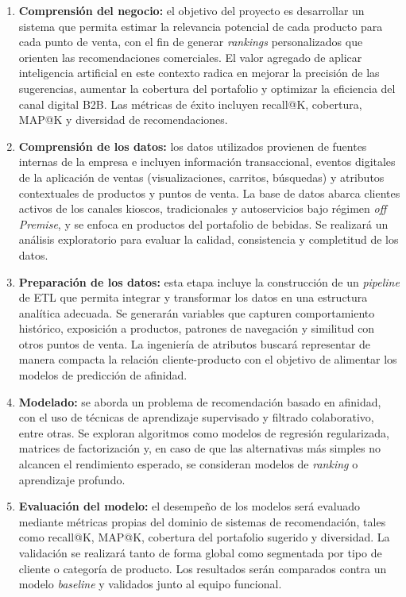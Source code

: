 \documentclass[
11pt, %
]{charter}
\begin{document}
\begin{enumerate}
\item \textbf{Comprensión del negocio:}
el objetivo del proyecto es desarrollar un sistema que permita estimar la relevancia potencial de cada producto para cada punto de venta, con el fin de generar \textit{rankings} personalizados que orienten las recomendaciones comerciales. El valor agregado de aplicar inteligencia artificial en este contexto radica en mejorar la precisión de las sugerencias, aumentar la cobertura del portafolio y optimizar la eficiencia del canal digital B2B. Las métricas de éxito incluyen recall@K, cobertura, MAP@K y diversidad de recomendaciones.

\item \textbf{Comprensión de los datos:}
los datos utilizados provienen de fuentes internas de la empresa e incluyen información transaccional, eventos digitales de la aplicación de ventas (visualizaciones, carritos, búsquedas) y atributos contextuales de productos y puntos de venta. La base de datos abarca clientes activos de los canales kioscos, tradicionales y autoservicios bajo régimen \textit{off Premise}, y se enfoca en productos del portafolio de bebidas. Se realizará un análisis exploratorio para evaluar la calidad, consistencia y completitud de los datos.

\item \textbf{Preparación de los datos:}
esta etapa incluye la construcción de un \textit{pipeline} de ETL que permita integrar y transformar los datos en una estructura analítica adecuada. Se generarán variables que capturen comportamiento histórico, exposición a productos, patrones de navegación y similitud con otros puntos de venta. La ingeniería de atributos buscará representar de manera compacta la relación cliente-producto con el objetivo de alimentar los modelos de predicción de afinidad.

\item \textbf{Modelado:}
se aborda un problema de recomendación basado en afinidad, con el uso de técnicas de aprendizaje supervisado y filtrado colaborativo, entre otras. Se exploran algoritmos como modelos de regresión regularizada, matrices de factorización y, en caso de que las alternativas más simples no alcancen el rendimiento esperado, se consideran modelos de \textit{ranking} o aprendizaje profundo.

\item \textbf{Evaluación del modelo:}
el desempeño de los modelos será evaluado mediante métricas propias del dominio de sistemas de recomendación, tales como recall@K, MAP@K, cobertura del portafolio sugerido y diversidad. La validación se realizará tanto de forma global como segmentada por tipo de cliente o categoría de producto. Los resultados serán comparados contra un modelo \textit{baseline} y validados junto al equipo funcional.


\end{enumerate}
\end{document}
